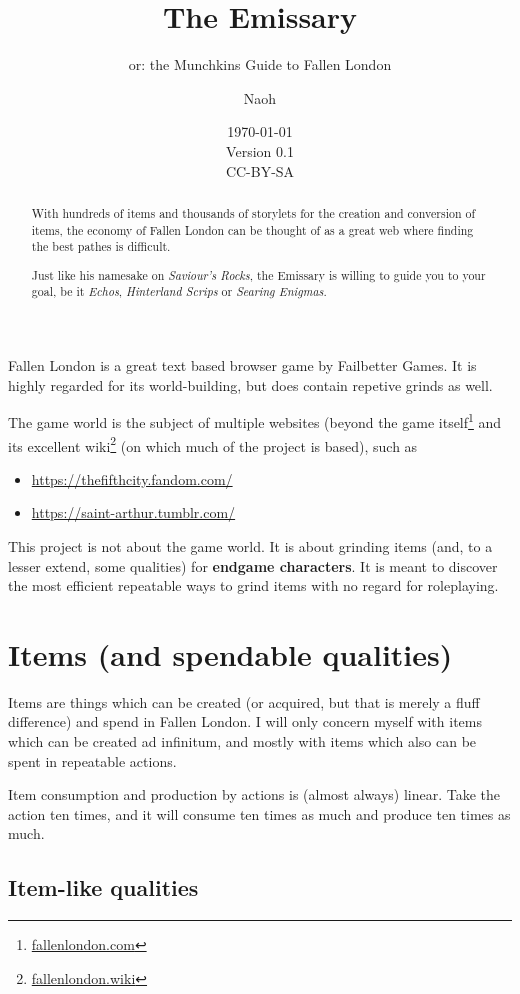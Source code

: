 \documentclass[a4paper,11pt,openright,twoside]{scrartcl}
\title{The Emissary}
\subtitle{or: the Munchkins Guide to Fallen London}
\date{\today \\ \small{Version 0.1 \\ CC-BY-SA } }
\author{Naoh}
\begin{document}


\maketitle
\begin{abstract}
With hundreds of items and thousands of storylets for the creation and conversion of items, the economy of Fallen London can be thought of as a great web where finding the best pathes is difficult. 

Just like his namesake on \emph{Saviour's Rocks}, the Emissary is willing to guide you to your goal, be it \emph{Echos}, \emph{Hinterland Scrips} or \emph{Searing Enigmas}. 
\end{abstract}

Fallen London is a great text based browser game by Failbetter Games. It is highly regarded for its world-building, but does contain repetive grinds as well.

The game world is the subject of multiple websites (beyond the game itself\footnote{\url{fallenlondon.com}} and its excellent wiki\footnote{\url{fallenlondon.wiki}} (on which much of the project is based), such as
\begin{itemize}
\item \url{https://thefifthcity.fandom.com/}
\item \url{https://saint-arthur.tumblr.com/}
\end{itemize}

This project is not about the game world. It is about grinding items (and, to a lesser extend, some qualities) for \textbf{endgame characters}. It is meant to discover the most efficient repeatable ways to grind items with no regard for roleplaying.

\section{Items (and spendable qualities)}

Items are things which can be created (or acquired, but that is merely a fluff difference) and spend in Fallen London. I will only concern myself with items which can be created ad infinitum, and mostly with items which also can be spent in repeatable actions. 

Item consumption and production by actions is (almost always) linear. Take the action ten times, and it will consume ten times as much and produce ten times as much. 

\subsection{Item-like qualities}
\end{document}
